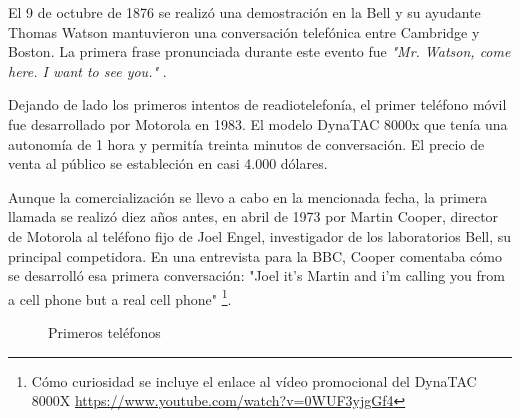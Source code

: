 El 9 de octubre de 1876 se realizó una demostración en la Bell y su ayudante Thomas Watson mantuvieron una conversación telefónica entre Cambridge y Boston. La primera frase pronunciada durante este evento fue \textit{"Mr. Watson, come here. I want to see you."} \cite{Even01}.

Dejando de lado los primeros intentos de readiotelefonía, el primer teléfono móvil fue desarrollado por Motorola en 1983. El modelo \ac{DynaTAC} 8000x que tenía una autonomía de 1 hora y permitía treinta minutos de conversación. El precio de venta al público se estableción en casi 4.000 dólares.

Aunque la comercialización se llevo a cabo en la  mencionada fecha, la primera llamada se realizó diez años antes, en abril de 1973 por Martin Cooper, director de Motorola al teléfono fijo de Joel Engel, investigador de los laboratorios Bell, su principal competidora. En una entrevista para la BBC, Cooper comentaba cómo se desarrolló esa primera conversación: "Joel it's Martin and i'm calling you from a cell phone but a real cell phone" \cite{BBC13}\footnote{Cómo curiosidad se incluye el enlace al vídeo promocional del DynaTAC 8000X \url{https://www.youtube.com/watch?v=0WUF3yjgGf4}}.

\begin{figure}[h!btp]
	\begin{adjustbox}{minipage=\linewidth, fbox}
		\centering
		\hspace{10mm}
	\end{adjustbox}
\caption{Primeros teléfonos}
	\label{fig:primeros-telefonos2}
\end{figure}

